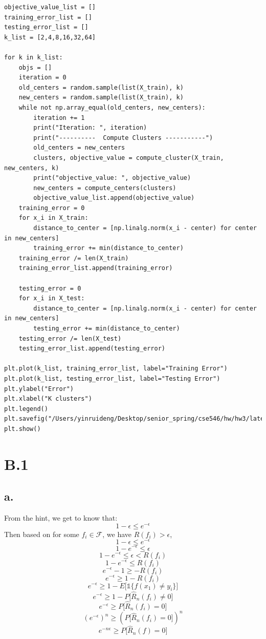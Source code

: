 \documentclass{article}
\begin{document}
\begin{verbatim}
objective_value_list = []
training_error_list = []
testing_error_list = []
k_list = [2,4,8,16,32,64]

for k in k_list:
	objs = []
	iteration = 0
	old_centers = random.sample(list(X_train), k)
	new_centers = random.sample(list(X_train), k)
	while not np.array_equal(old_centers, new_centers):
		iteration += 1
		print("Iteration: ", iteration)
		print("----------  Compute Clusters -----------")
		old_centers = new_centers
		clusters, objective_value = compute_cluster(X_train, new_centers, k)
		print("objective_value: ", objective_value)
		new_centers = compute_centers(clusters)
		objective_value_list.append(objective_value)
	training_error = 0
	for x_i in X_train:
		distance_to_center = [np.linalg.norm(x_i - center) for center in new_centers]
		training_error += min(distance_to_center)
	training_error /= len(X_train)
	training_error_list.append(training_error)
		
	testing_error = 0
	for x_i in X_test:
		distance_to_center = [np.linalg.norm(x_i - center) for center in new_centers]
		testing_error += min(distance_to_center)
	testing_error /= len(X_test)
	testing_error_list.append(testing_error)

plt.plot(k_list, training_error_list, label="Training Error")
plt.plot(k_list, testing_error_list, label="Testing Error")
plt.ylabel("Error")
plt.xlabel("K clusters")
plt.legend()
plt.savefig("/Users/yinruideng/Desktop/senior_spring/cse546/hw/hw3/latex/plots/A4/A4c.png")
plt.show()
\end{verbatim}




\section*{B.1}

\subsection*{a.}
From the hint, we get to know that:
\[ 1- \epsilon \le e^{-\epsilon} \]
Then based on for some $f_i \in \mathcal{F}$, we have $R(f_i) > \epsilon$,
\[ 1- \epsilon \le e^{-\epsilon} \]
\[ 1 - e^{-\epsilon} \le \epsilon \] 
\[ 1 - e^{-\epsilon} \le \epsilon < R(f_i) \]
\[ 1 - e^{-\epsilon} \le R(f_i) \]
\[ e^{-\epsilon} -1 \ge - R(f_i) \]
\[ e^{-\epsilon} \ge 1 - R(f_i) \]
\[ e^{-\epsilon} \ge 1 - E \bigg[ \mathds{1} \{ f(x_1) \neq y_i \} \bigg] \]
\[ e^{-\epsilon} \ge 1 - P \bigg[ \hat{R}_n (f_i) \neq 0 \bigg] \]
\[ e^{-\epsilon} \ge P \bigg[ \hat{R}_n (f_i) = 0 \bigg] \]
\[ (e^{-\epsilon})^n \ge (P \bigg[ \hat{R}_n (f_i) = 0 \bigg] )^n\]
\[ e^{-n\epsilon} \ge P \bigg[ \hat{R}_n (f) = 0 \bigg] \]
\end{document}
